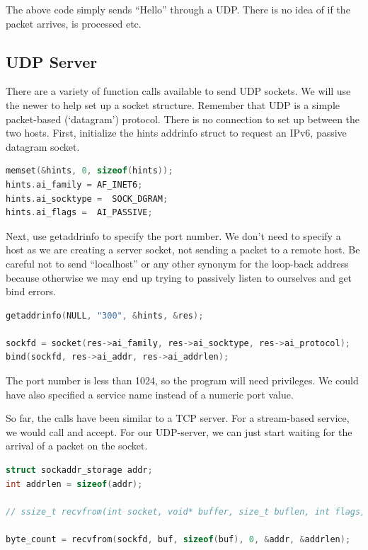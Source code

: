The above code simply sends ``Hello'' through a UDP. There is no idea of if the packet arrives, is processed etc.

\subsection{UDP Server}

There are a variety of function calls available to send UDP sockets.
We will use the newer  to help set up a socket structure.
Remember that UDP is a simple packet-based (`datagram') protocol. There is no connection to set up between the two hosts.
First, initialize the hints addrinfo struct to request an IPv6, passive datagram socket.

\begin{lstlisting}[language=C]
memset(&hints, 0, sizeof(hints));
hints.ai_family = AF_INET6;
hints.ai_socktype =  SOCK_DGRAM;
hints.ai_flags =  AI_PASSIVE;
\end{lstlisting}

Next, use getaddrinfo to specify the port number.
We don't need to specify a host as we are creating a server socket, not sending a packet to a remote host.
Be careful not to send ``localhost'' or any other synonym for the loop-back address because otherwise we may end up trying to passively listen to ourselves and get bind errors.

\begin{lstlisting}[language=C]
getaddrinfo(NULL, "300", &hints, &res);

sockfd = socket(res->ai_family, res->ai_socktype, res->ai_protocol);
bind(sockfd, res->ai_addr, res->ai_addrlen);
\end{lstlisting}

The port number is less than 1024, so the program will need  privileges.
We could have also specified a service name instead of a numeric port value.

So far, the calls have been similar to a TCP server.
For a stream-based service, we would call  and accept.
For our UDP-server, we can just start waiting for the arrival of a packet on the socket.

\begin{lstlisting}[language=C]
struct sockaddr_storage addr;
int addrlen = sizeof(addr);

// ssize_t recvfrom(int socket, void* buffer, size_t buflen, int flags, struct sockaddr *addr, socklen_t * address_len);

byte_count = recvfrom(sockfd, buf, sizeof(buf), 0, &addr, &addrlen);
\end{lstlisting}

